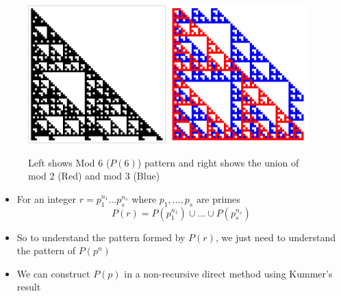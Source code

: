 \documentclass{beamer}
\begin{document}
\begin{frame}
    \begin{figure}
        \centering
        \includegraphics[width=0.475\textwidth]{Mod6.pdf}
        \hfill
        \includegraphics[width=0.475\textwidth]{mod2,3.jpg}
        \caption{Left shows Mod 6 ($P(6)$) pattern and right shows the union of mod 2 (Red) and mod 3 (Blue)}
    \end{figure}
\end{frame}


\begin{frame}
    \begin{itemize}
        \item For an integer $r = p_1^{n_1}\dots p_s^{n_s}$ where $p_1,\dots,p_s$ are primes
        \begin{equation*}
            P(r) = P(p_1^{n_1}) \cup ... \cup P(p_s^{n_s})
        \end{equation*}
        \item So to understand the pattern formed by $P(r)$, we just need to understand the pattern of $P(p^n)$
        \item We can construct $P(p)$ in a non-recursive direct method using Kummer's result
    \end{itemize}
\end{frame}
\end{document}
